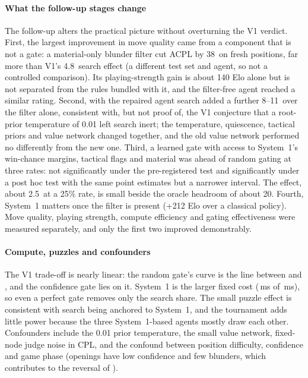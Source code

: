 \paragraph*{What the follow-up stages change}
The follow-up alters the practical picture without overturning the V1 verdict. First, the largest improvement in move quality came from a component that is not a gate: a material-only blunder filter cut ACPL by 38\cp\ on fresh positions, far more than V1's 4.8\cp\ search effect (a different test set and agent, so not a controlled comparison). Its playing-strength gain is about 140 Elo alone but is not separated from the rules bundled with it, and the filter-free agent reached a similar rating. Second, with the repaired agent search added a further 8--11\cp\ over the filter alone, consistent with, but not proof of, the V1 conjecture that a root-prior temperature of 0.01 left search inert; the temperature, quiescence, tactical priors and value network changed together, and the old value network performed no differently from the new one. Third, a learned gate with access to System~1's win-chance margins, tactical flags and material was ahead of random gating at three rates: not significantly under the pre-registered test and significantly under a post hoc test with the same point estimates but a narrower interval. The effect, about 2.5\cp\ at a 25\% rate, is small beside the oracle headroom of about 20\cp. Fourth, System~1 matters once the filter is present (+212 Elo over a classical policy). Move quality, playing strength, compute efficiency and gating effectiveness were measured separately, and only the first two improved demonstrably.

\paragraph*{Compute, puzzles and confounders}
The V1 trade-off is nearly linear: the random gate's curve is the line between  and , and the confidence gate lies on it. System~1 is the larger fixed cost (\msLayaPart\,ms of \msSTwo\,ms), so even a perfect gate removes only the search share. The small puzzle effect is consistent with search being anchored to System~1, and the tournament adds little power because the three System~1-based agents mostly draw each other. Confounders include the 0.01 prior temperature, the small value network, fixed-node judge noise in CPL, and the confound between position difficulty, confidence and game phase (openings have low confidence and few blunders, which contributes to the reversal of \Hfour{}).
